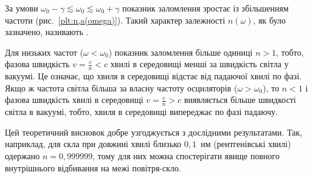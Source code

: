 За умови $\omega_0 - \gamma \lesssim \omega_0 \lesssim \omega_0 + \gamma$ показник заломлення зростає із збільшенням частоти (рис.~\ref{plt:n,a(omega)}). Такий характер залежності $n(\omega)$, як було зазначено, називають .








\begin{Attention}\small

	Для низьких частот ($\omega < \omega_0$) показник заломлення більше одиниці $n > 1$, тобто, фазова швидкість $v = \frac{c}{n} < c$ хвилі в середовищі менші за швидкість світла у вакуумі. Це означає, що хвиля в середовищі відстає від падаючої хвилі по фазі. Якщо ж частота світла більша за власну частоту осциляторів ($\omega > \omega_0$), то $n < 1$ і фазова швидкість хвилі в середовищі $v = \frac{c}{n} > c$ виявляється більше швидкості світла в вакуумі, тобто,  хвиля в середовищі випереджає по фазі падаючу.

	Цей теоретичний висновок добре узгоджується з дослідними результатами. Так, наприклад, для скла при довжині хвилі близько $0,1$~нм (рентгенівські хвилі) одержано $n = 0,999999$, тому для них можна спостерігати явище повного внутрішнього відбивання на межі повітря-скло.
\end{Attention}

